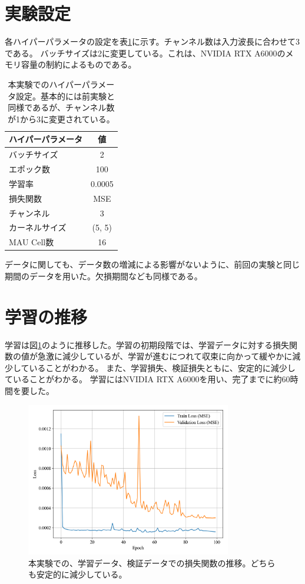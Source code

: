   \section{実験設定}
    各ハイパーパラメータの設定を表\ref{tab:exp2_hyperparameters}に示す。チャンネル数は入力波長に合わせて3である。
    バッチサイズは2に変更している。これは、NVIDIA RTX A6000のメモリ容量の制約によるものである。
    \begin{table}[htbp]
      \centering
      \begin{tabular}{lc}
      \hline
      ハイパーパラメータ & 値 \\
      \hline\hline
      バッチサイズ & 2 \\
      \hline
      エポック数 & 100 \\
      \hline
      学習率 & 0.0005 \\
      \hline
      損失関数 & MSE \\
      \hline
      チャンネル & 3 \\
      \hline
      カーネルサイズ & (5, 5) \\
      \hline
      MAU Cell数 & 16 \\
      \hline
      \end{tabular}
      \caption{本実験でのハイパーパラメータ設定。基本的には前実験と同様であるが、チャンネル数が1から3に変更されている。}
      \label{tab:exp2_hyperparameters}
    \end{table}
    データに関しても、データ数の増減による影響がないように、前回の実験と同じ期間のデータを用いた。欠損期間なども同様である。

  \section{学習の推移}
  学習は図\ref{fig:exp2_learn_progress}のように推移した。学習の初期段階では、学習データに対する損失関数の値が急激に減少しているが、学習が進むにつれて収束に向かって緩やかに減少していることがわかる。
  また、学習損失、検証損失ともに、安定的に減少していることがわかる。
  学習にはNVIDIA RTX A6000を用い、完了までに約60時間を要した。
  \begin{figure}[htbp]
    \centering
    \includegraphics[width=0.8\textwidth]{figures/exp1/loss.png}
    \caption{本実験での、学習データ、検証データでの損失関数の推移。どちらも安定的に減少している。}
    \label{fig:exp2_learn_progress}
  \end{figure}

